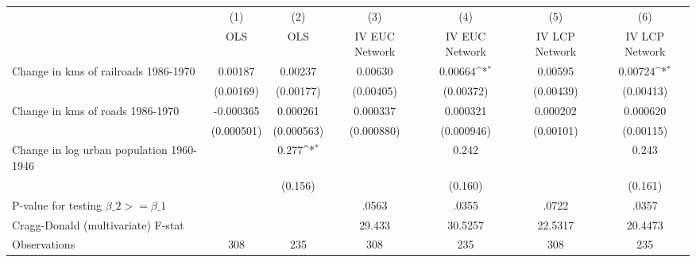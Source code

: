 {
\def\sym#1{\ifmmode^{#1}\else\(^{#1}\)\fi}
\begin{tabular}{l*{6}{c}}
\hline\hline
                &\multicolumn{1}{c}{(1)}&\multicolumn{1}{c}{(2)}&\multicolumn{1}{c}{(3)}&\multicolumn{1}{c}{(4)}&\multicolumn{1}{c}{(5)}&\multicolumn{1}{c}{(6)}\\
                &\multicolumn{1}{c}{OLS}&\multicolumn{1}{c}{OLS}&\multicolumn{1}{c}{IV EUC Network}&\multicolumn{1}{c}{IV EUC Network}&\multicolumn{1}{c}{IV LCP Network}&\multicolumn{1}{c}{IV LCP Network}\\
\hline
Change in kms of railroads 1986-1970&  0.00187         &  0.00237         &  0.00630         &  0.00664\sym{*}  &  0.00595         &  0.00724\sym{*}  \\
                &(0.00169)         &(0.00177)         &(0.00405)         &(0.00372)         &(0.00439)         &(0.00413)         \\
[1em]
Change in kms of roads 1986-1970&-0.000365         & 0.000261         & 0.000337         & 0.000321         & 0.000202         & 0.000620         \\
                &(0.000501)         &(0.000563)         &(0.000880)         &(0.000946)         &(0.00101)         &(0.00115)         \\
[1em]
Change in log urban population 1960-1946&                  &    0.277\sym{*}  &                  &    0.242         &                  &    0.243         \\
                &                  &  (0.156)         &                  &  (0.160)         &                  &  (0.161)         \\
\hline
P-value for testing $\beta\_{2} >= \beta\_{1}$&                  &                  &    .0563         &    .0355         &    .0722         &    .0357         \\
Cragg-Donald (multivariate) F-stat&                  &                  &   29.433         &  30.5257         &  22.5317         &  20.4473         \\
Observations    &      308         &      235         &      308         &      235         &      308         &      235         \\
\hline\hline
\end{tabular}
}
